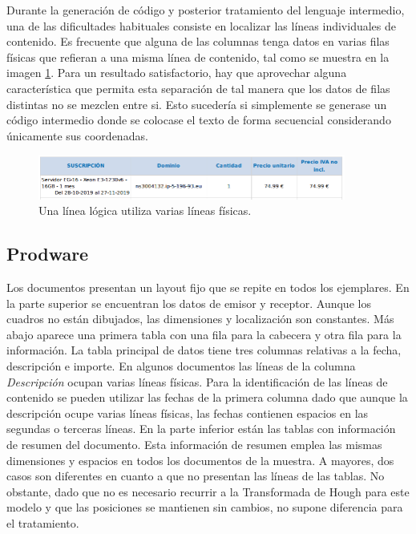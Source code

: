 Durante la generación de código y posterior tratamiento del lenguaje intermedio, una de las dificultades habituales consiste en localizar las líneas individuales de contenido. Es frecuente que alguna de las columnas tenga datos en varias filas físicas que refieran a una misma línea de contenido, tal como se muestra en la imagen \ref{fig:una-linea-lógica-varias-fisicas}. Para un resultado satisfactorio, hay que aprovechar alguna característica que permita esta separación de tal manera que los datos de filas distintas no se mezclen entre si. Esto sucedería si simplemente se generase un código intermedio donde se colocase el texto de forma secuencial considerando únicamente sus coordenadas.

\begin{figure}[hp!]
    \centering
    \includegraphics[width=0.9\textwidth]{imaxes/g-analisis/varias-lineas-en-una.png}
    \caption{Una línea lógica utiliza varias líneas físicas.}
    \label{fig:una-linea-lógica-varias-fisicas}
\end{figure}

\subsection{Prodware}

Los documentos presentan un layout fijo que se repite en todos los ejemplares. En la parte superior se encuentran los datos de emisor y receptor. Aunque los cuadros no están dibujados, las dimensiones y localización son constantes. Más abajo aparece una primera tabla con una fila para la cabecera y otra fila para la información. La tabla principal de datos tiene tres columnas relativas a la fecha, descripción e importe. En algunos documentos las líneas de la columna \emph{Descripción} ocupan varias líneas físicas. Para la identificación de las líneas de contenido se pueden utilizar las fechas de la primera columna dado que aunque la descripción ocupe varias líneas físicas, las fechas contienen espacios en las segundas o terceras líneas. En la parte inferior están las tablas con información de resumen del documento. Esta información de resumen emplea las mismas dimensiones y espacios en todos los documentos de la muestra. A mayores, dos casos son diferentes en cuanto a que no presentan las líneas de las tablas. No obstante, dado que no es necesario recurrir a la Transformada de Hough para este modelo y que las posiciones se mantienen sin cambios, no supone diferencia para el tratamiento.
 
